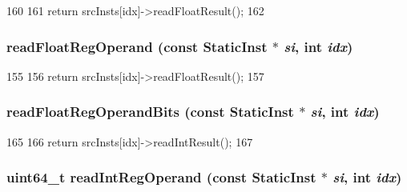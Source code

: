 \begin{DoxyCode}
160     {
161         return srcInsts[idx]->readFloatResult();
162     }
\end{DoxyCode}
\hypertarget{classOzoneDynInst_a717c88c8c56d79c9ed554ba5992bd8c3}{
\subsubsection[{readFloatRegOperand}]{ readFloatRegOperand (const {\bf StaticInst} $\ast$ {\em si}, \/  int {\em idx})}}
\label{classOzoneDynInst_a717c88c8c56d79c9ed554ba5992bd8c3}



\begin{DoxyCode}
155     {
156         return srcInsts[idx]->readFloatResult();
157     }
\end{DoxyCode}
\hypertarget{classOzoneDynInst_a39d93624e4481f4a210f2c46ea6b15b0}{
\subsubsection[{readFloatRegOperandBits}]{ readFloatRegOperandBits (const {\bf StaticInst} $\ast$ {\em si}, \/  int {\em idx})}}
\label{classOzoneDynInst_a39d93624e4481f4a210f2c46ea6b15b0}



\begin{DoxyCode}
165     {
166         return srcInsts[idx]->readIntResult();
167     }
\end{DoxyCode}
\hypertarget{classOzoneDynInst_a9e7b0a4d5373c48902425c9456b19e7e}{
\subsubsection[{readIntRegOperand}]{\setlength{\rightskip}{0pt plus 5cm}uint64\_\-t readIntRegOperand (const {\bf StaticInst} $\ast$ {\em si}, \/  int {\em idx})}}
\label{classOzoneDynInst_a9e7b0a4d5373c48902425c9456b19e7e}



